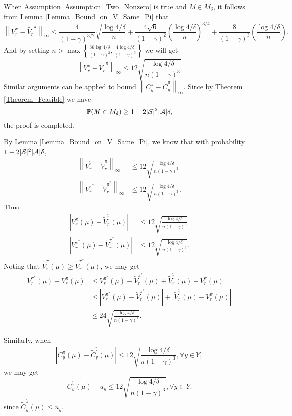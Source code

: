 When Assumption \ref{Assumption_Two_Nonzero} is true and $M\in M_\delta$, it follows from Lemma \ref{Lemma_Bound_on_V_Same_Pi} that
$$
\left\|V_r^\pi -\widetilde{V_r}^\pi\right\|_\infty\leq \frac{4}{(1-\gamma)^{3/2}}\sqrt{\frac{\log 4/\delta}{n}} +\frac{4\sqrt{6}}{(1-\gamma)^2}\left(\frac{\log 4/\delta}{n}\right)^{3/4}+ \frac{8}{(1-\gamma)^3}\left(\frac{\log 4/\delta}{n}\right).
$$
And by setting $n>\max\left\{\frac{36\log4/\delta}{(1-\gamma)^2},\frac{4\log4/\delta}{(1-\gamma)^3}\right\}$ we will get
$$\left\|V_r^\pi -\widetilde{V_r}^\pi\right\|_\infty\leq 12\sqrt{\frac{\log 4/\delta}{n(1-\gamma)^3}}.
$$
Similar arguments can be applied to bound $\left\|C_y^\pi-\widetilde{C}_y^\pi\right\|_\infty$. Since by Theorem \ref{Theorem_Feasible} we have 
$${\mathbb P}(M\in M_\delta)\geq 1-2|{\mathcal{S}}|^2|{\mathcal{A}}|\delta,
$$
the proof is completed.
\endproof


By Lemma \ref{Lemma_Bound_on_V_Same_Pi}, we know that with probability $1-2|{\mathcal{S}}|^2|{\mathcal{A}}|\delta$,
$$\begin{aligned}
\left\|V_r^{\tilde \pi}-\tilde V_r^{\tilde \pi}\right\|_\infty&\leq12\sqrt{\frac{\log 4/\delta}{n(1-\gamma)^3}}\\
\left\|V_r^{\pi^*}-\tilde V_r^{\pi^*}\right\|_\infty&\leq 12\sqrt{\frac{\log 4/\delta}{n(1-\gamma)^3}}.
\end{aligned}
$$
Thus
$$\begin{aligned}
|V_r^{\tilde \pi}(\mu)-\tilde V_r^{\tilde \pi}(\mu)|&\leq12\sqrt{\frac{\log 4/\delta}{n(1-\gamma)^3}}\\
|V_r^{\pi^*}(\mu)-\tilde V_r^{\pi^*}(\mu)|&\leq12\sqrt{\frac{\log 4/\delta}{n(1-\gamma)^3}}.
\end{aligned}
$$ 
Noting that $\tilde V_r^{\tilde\pi}(\mu)\geq\tilde V_r^{\pi^*}(\mu)$, we may get
$$
\begin{aligned}
V_r^{\pi^*}(\mu)-V_r^{\tilde \pi}(\mu)&\leq V_r^{\pi^*}(\mu)-\tilde V_r^{\pi^*}(\mu)+\tilde V_r^{\tilde \pi}(\mu)-V_r^{\tilde \pi}(\mu)\\
&\leq|V_r^{\pi^*}(\mu)-\tilde V_r^{\pi^*}(\mu)| + |\tilde V_r^{\tilde \pi}(\mu)-V_r^{\tilde \pi}(\mu)|\\
&\leq 24\sqrt{\frac{\log 4/\delta}{n(1-\gamma)^3}}.
\end{aligned}
$$

Similarly, when
$$|C_y^{\tilde \pi}(\mu)-\tilde C_y^{\tilde \pi}(\mu)|\leq12\sqrt{\frac{\log 4/\delta}{n(1-\gamma)^3}},\forall y\in Y,
$$
we may get 
$$C_y^{\tilde \pi}(\mu) - u_y \leq 12\sqrt{\frac{\log 4/\delta}{n(1-\gamma)^3}},\forall y\in Y.
$$
since $\tilde C_y^{\tilde \pi}(\mu)\leq u_y$.
\endproof

